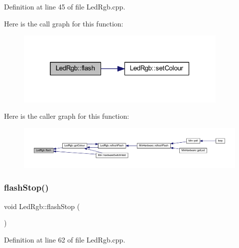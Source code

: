 Definition at line 45 of file Led\+Rgb.\+cpp.

Here is the call graph for this function\+:
\nopagebreak
\begin{figure}[H]
\begin{center}
\leavevmode
\includegraphics[width=289pt]{class_led_rgb_a8d81b6020efb6e5f786542451d4dffbc_cgraph}
\end{center}
\end{figure}
Here is the caller graph for this function\+:
\nopagebreak
\begin{figure}[H]
\begin{center}
\leavevmode
\includegraphics[width=350pt]{class_led_rgb_a8d81b6020efb6e5f786542451d4dffbc_icgraph}
\end{center}
\end{figure}
\mbox{\label{class_led_rgb_a096a0af0eb4d3c5d4c6a3f4b3aaeb9e7}} 
\subsubsection{\texorpdfstring{flash\+Stop()}{flashStop()}}
{\footnotesize\ttfamily void Led\+Rgb\+::flash\+Stop (\begin{DoxyParamCaption}{ }\end{DoxyParamCaption})}



Definition at line 62 of file Led\+Rgb.\+cpp.


